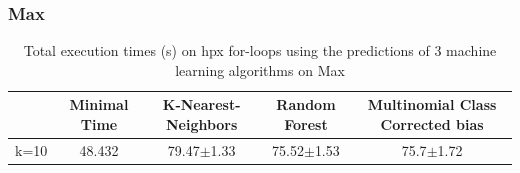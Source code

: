\subsubsection{Max}
\begin{table}[h]
	\centering
	\caption{Total execution times (s) on hpx for-loops using the predictions of 3 machine learning algorithms on Max}
	\label{my-label}
	\begin{tabular}{|c|c|c|c|c|}
		\hline
		& Minimal Time&K-Nearest-Neighbors & Random Forest &Multinomial Class Corrected bias\\ \hline
		k=10  &48.432&
		79.47$\pm$1.33       & 75.52$\pm$1.53&75.7$\pm$1.72 \\ \hline
	\end{tabular}
\end{table}

